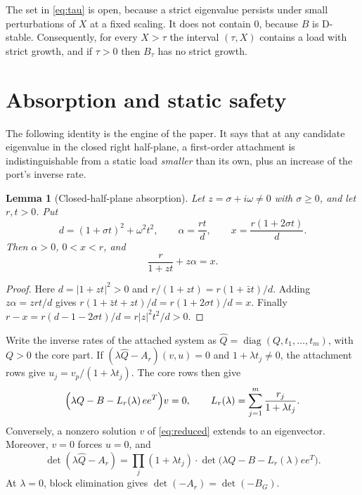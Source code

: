 \documentclass[11pt,a4paper]{article}
\theoremstyle{plain}
\newtheorem{lemma}[theorem]{Lemma}
\theoremstyle{definition}
\theoremstyle{remark}
\newcommand{\diag}{\operatorname{diag}}
\begin{document}
The set in \eqref{eq:tau} is open, because a strict eigenvalue persists under
small perturbations of $X$ at a fixed scaling. It does not contain $0$, because
$B$ is D-stable. Consequently, for every $X>\tau$ the interval $(\tau,X)$ contains a load with
strict growth, and if $\tau>0$ then $B_\tau$ has no strict growth.

\section{Absorption and static safety}\label{sec:absorb}

The following identity is the engine of the paper. It says that at any
candidate eigenvalue in the closed right half-plane, a first-order attachment
is indistinguishable from a static load \emph{smaller} than its own, plus an
increase of the port's inverse rate.

\begin{lemma}[Closed-half-plane absorption]\label{lem:absorb}
Let $z=\sigma+i\omega\ne0$ with $\sigma\ge0$, and let $r,t>0$. Put
\begin{equation}\label{eq:absorb}
 d=(1+\sigma t)^2+\omega^2t^2,\qquad \alpha=\frac{rt}{d},\qquad
 x=\frac{r(1+2\sigma t)}{d}.
\end{equation}
Then $\alpha>0$, $0<x<r$, and
\begin{equation}\label{eq:identity}
 \frac{r}{1+zt}+z\alpha=x .
\end{equation}
\end{lemma}
\begin{proof}
Here $d=|1+zt|^2>0$ and $r/(1+zt)=r(1+\bar zt)/d$. Adding $z\alpha=zrt/d$
gives $r(1+\bar zt+zt)/d=r(1+2\sigma t)/d=x$. Finally
$r-x=r(d-1-2\sigma t)/d=r|z|^2t^2/d>0$.
\end{proof}

Write the inverse rates of the attached system as $\hat Q=\diag(Q,t_1,\dots,
t_m)$, with $Q>0$ the core part. If $(\lambda\hat Q-A_r)(v,u)=0$ and
$1+\lambda t_j\ne0$, the attachment rows give $u_j=v_p/(1+\lambda t_j)$. The
core rows then give
\begin{equation}\label{eq:reduced}
 \Bigl(\lambda Q-B-L_r(\lambda)\,ee^{T}\Bigr)v=0,\qquad
 L_r(\lambda)=\sum_{j=1}^m\frac{r_j}{1+\lambda t_j}.
\end{equation}
Conversely, a nonzero solution $v$ of \eqref{eq:reduced} extends to an
eigenvector. Moreover, $v=0$ forces $u=0$, and
\[
 \det(\lambda\hat Q-A_r)=\prod_j(1+\lambda t_j)\cdot
 \det\bigl(\lambda Q-B-L_r(\lambda)ee^{T}\bigr).
\]
At $\lambda=0$, block elimination gives $\det(-A_r)=\det(-B_G)$.
\end{document}
